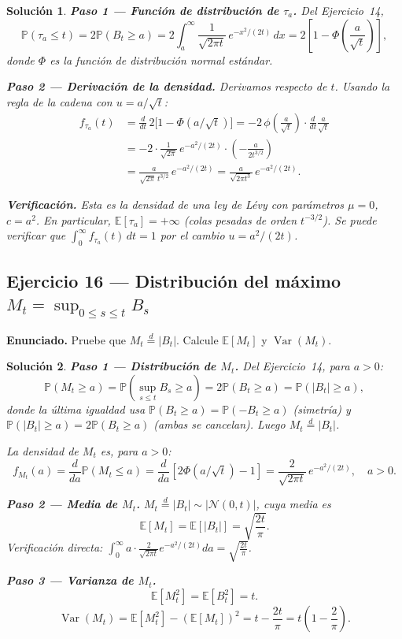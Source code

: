 \documentclass[12pt,letterpaper]{article}
\theoremstyle{ejercicio}
\theoremstyle{solucion}
\newtheorem*{solucion}{Solución}
\newcommand{\E}{\mathbb{E}}
\newcommand{\Var}{\operatorname{Var}}
\newcommand{\dto}{\overset{d}{=}}
\renewcommand{\P}{\mathbb{P}}
\begin{document}
\begin{solucion}

\textbf{Paso 1 — Función de distribución de $\tau_a$.}
Del Ejercicio~14,
\[
  \P(\tau_a\le t) = 2\P(B_t\ge a)
  = 2\int_a^\infty \frac{1}{\sqrt{2\pi t}}\,e^{-x^2/(2t)}\,dx
  = 2\left[1-\Phi\!\left(\frac{a}{\sqrt{t}}\right)\right],
\]
donde $\Phi$ es la función de distribución normal estándar.

\textbf{Paso 2 — Derivación de la densidad.}
Derivamos respecto de $t$. Usando la regla de la cadena con $u=a/\sqrt{t}$:
\begin{align*}
  f_{\tau_a}(t)
  &= \frac{d}{dt}\,2\bigl[1-\Phi(a/\sqrt{t})\bigr]
   = -2\,\phi\!\left(\frac{a}{\sqrt{t}}\right)\cdot\frac{d}{dt}\frac{a}{\sqrt{t}}\\
  &= -2\cdot\frac{1}{\sqrt{2\pi}}\,e^{-a^2/(2t)}\cdot\left(-\frac{a}{2t^{3/2}}\right)\\
  &= \frac{a}{\sqrt{2\pi}\,t^{3/2}}\,e^{-a^2/(2t)}
   = \frac{a}{\sqrt{2\pi t^3}}\,e^{-a^2/(2t)}.
\end{align*}

\textbf{Verificación.} Esta es la densidad de una ley de Lévy con parámetros $\mu=0$,
$c=a^2$. En particular, $\E[\tau_a]=+\infty$ (colas pesadas de orden $t^{-3/2}$).
Se puede verificar que $\int_0^\infty f_{\tau_a}(t)\,dt=1$ por el cambio $u=a^2/(2t)$.
\end{solucion}

\subsection*{Ejercicio 16 — Distribución del máximo $M_t=\sup_{0\le s\le t}B_s$}

\begin{recuadro}
\textbf{Enunciado.} Pruebe que $M_t\dto|B_t|$. Calcule $\E[M_t]$ y $\Var(M_t)$.
\end{recuadro}

\begin{solucion}

\textbf{Paso 1 — Distribución de $M_t$.}
Del Ejercicio~14, para $a>0$:
\[
  \P(M_t\ge a) = \P\!\left(\sup_{s\le t}B_s\ge a\right) = 2\P(B_t\ge a) = \P(|B_t|\ge a),
\]
donde la última igualdad usa $\P(B_t\ge a)=\P(-B_t\ge a)$ (simetría) y
$\P(|B_t|\ge a)=2\P(B_t\ge a)$ (ambas se cancelan). Luego $M_t\dto|B_t|$.

La densidad de $M_t$ es, para $a>0$:
\[
  f_{M_t}(a) = \frac{d}{da}\P(M_t\le a) = \frac{d}{da}[2\Phi(a/\sqrt{t})-1]
  = \frac{2}{\sqrt{2\pi t}}\,e^{-a^2/(2t)},\quad a>0.
\]

\textbf{Paso 2 — Media de $M_t$.}
$M_t\dto|B_t|\sim|\mathcal{N}(0,t)|$, cuya media es
\[
  \E[M_t] = \E[|B_t|] = \sqrt{\frac{2t}{\pi}}.
\]
Verificación directa: $\int_0^\infty a\cdot\frac{2}{\sqrt{2\pi t}}e^{-a^2/(2t)}da
= \sqrt{\frac{2t}{\pi}}$.

\textbf{Paso 3 — Varianza de $M_t$.}
\[
  \E[M_t^2] = \E[B_t^2] = t.
\]
\[
  \Var(M_t) = \E[M_t^2]-(\E[M_t])^2 = t - \frac{2t}{\pi} = t\left(1-\frac{2}{\pi}\right).
\]
\end{solucion}
\end{document}
